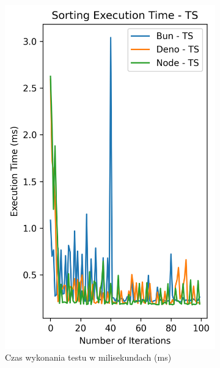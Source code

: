\begin{figure}[H]
  \centering
  \begin{subfigure}[b]{0.4\textwidth}
    \centering
    \includegraphics[width=\textwidth]{Figures/sorting/sorting_quick_100_1000_ts_time.png}
    \caption{Czas wykonania testu w milisekundach (ms)}
    \label{fig:quick_sorting_e1_tsquick_sorting_e1_time}
  \end{subfigure}
  \begin{subfigure}[b]{0.4\textwidth}
    \centering

\end{subfigure}
\end{figure}
